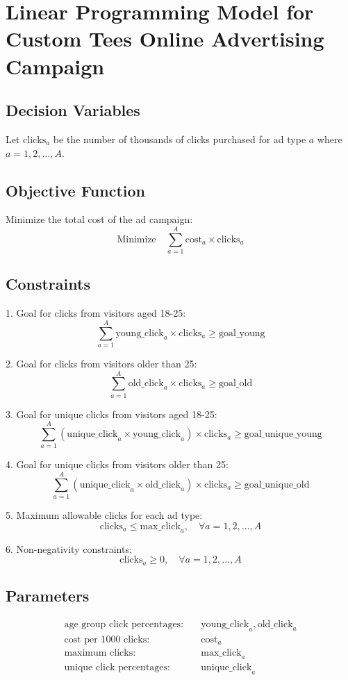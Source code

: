 \documentclass{article}
\begin{document}
\section*{Linear Programming Model for Custom Tees Online Advertising Campaign}

\subsection*{Decision Variables}
Let \( \text{clicks}_a \) be the number of thousands of clicks purchased for ad type \( a \) where \( a = 1, 2, \ldots, A \).

\subsection*{Objective Function}
Minimize the total cost of the ad campaign:
\[
\text{Minimize} \quad \sum_{a=1}^{A} \text{cost}_a \times \text{clicks}_a
\]

\subsection*{Constraints}

1. Goal for clicks from visitors aged 18-25:
\[
\sum_{a=1}^{A} \text{young\_click}_{a} \times \text{clicks}_a \geq \text{goal\_young}
\]

2. Goal for clicks from visitors older than 25:
\[
\sum_{a=1}^{A} \text{old\_click}_{a} \times \text{clicks}_a \geq \text{goal\_old}
\]

3. Goal for unique clicks from visitors aged 18-25:
\[
\sum_{a=1}^{A} \left( \text{unique\_click}_{a} \times \text{young\_click}_{a} \right) \times \text{clicks}_a \geq \text{goal\_unique\_young}
\]

4. Goal for unique clicks from visitors older than 25:
\[
\sum_{a=1}^{A} \left( \text{unique\_click}_{a} \times \text{old\_click}_{a} \right) \times \text{clicks}_a \geq \text{goal\_unique\_old}
\]

5. Maximum allowable clicks for each ad type:
\[
\text{clicks}_a \leq \text{max\_click}_{a}, \quad \forall a = 1, 2, \ldots, A
\]

6. Non-negativity constraints:
\[
\text{clicks}_a \geq 0, \quad \forall a = 1, 2, \ldots, A
\]

\subsection*{Parameters}
\begin{align*}
\text{age group click percentages:} & \quad \text{young\_click}_{a}, \text{old\_click}_{a} \\
\text{cost per 1000 clicks:} & \quad \text{cost}_{a} \\
\text{maximum clicks:} & \quad \text{max\_click}_{a} \\
\text{unique click percentages:} & \quad \text{unique\_click}_{a}
\end{align*}
\end{document}
